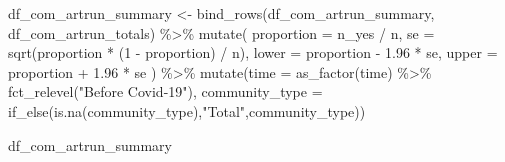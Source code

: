 \documentclass[
  letterpaper,
  DIV=11,
  numbers=noendperiod]{scrartcl}
\newenvironment{Shaded}{\begin{snugshade}}{\end{snugshade}}
\newcommand{\AttributeTok}[1]{\textcolor[rgb]{0.40,0.45,0.13}{#1}}
\newcommand{\DecValTok}[1]{\textcolor[rgb]{0.68,0.00,0.00}{#1}}
\newcommand{\FloatTok}[1]{\textcolor[rgb]{0.68,0.00,0.00}{#1}}
\newcommand{\FunctionTok}[1]{\textcolor[rgb]{0.28,0.35,0.67}{#1}}
\newcommand{\NormalTok}[1]{\textcolor[rgb]{0.00,0.23,0.31}{#1}}
\newcommand{\OtherTok}[1]{\textcolor[rgb]{0.00,0.23,0.31}{#1}}
\newcommand{\SpecialCharTok}[1]{\textcolor[rgb]{0.37,0.37,0.37}{#1}}
\newcommand{\StringTok}[1]{\textcolor[rgb]{0.13,0.47,0.30}{#1}}
\begin{document}
\begin{Shaded}
\begin{Highlighting}[]
\NormalTok{df\_com\_artrun\_summary }\OtherTok{\textless{}{-}} \FunctionTok{bind\_rows}\NormalTok{(df\_com\_artrun\_summary, df\_com\_artrun\_totals) }\SpecialCharTok{\%\textgreater{}\%}
  \FunctionTok{mutate}\NormalTok{(}
    \AttributeTok{proportion =}\NormalTok{ n\_yes }\SpecialCharTok{/}\NormalTok{ n,}
    \AttributeTok{se =} \FunctionTok{sqrt}\NormalTok{(proportion }\SpecialCharTok{*}\NormalTok{ (}\DecValTok{1} \SpecialCharTok{{-}}\NormalTok{ proportion) }\SpecialCharTok{/}\NormalTok{ n),}
    \AttributeTok{lower =}\NormalTok{ proportion }\SpecialCharTok{{-}} \FloatTok{1.96} \SpecialCharTok{*}\NormalTok{ se,}
    \AttributeTok{upper =}\NormalTok{ proportion }\SpecialCharTok{+} \FloatTok{1.96} \SpecialCharTok{*}\NormalTok{ se}
\NormalTok{  ) }\SpecialCharTok{\%\textgreater{}\%} 
 \FunctionTok{mutate}\NormalTok{(}\AttributeTok{time =} \FunctionTok{as\_factor}\NormalTok{(time) }\SpecialCharTok{\%\textgreater{}\%} 
           \FunctionTok{fct\_relevel}\NormalTok{(}\StringTok{"Before Covid{-}19"}\NormalTok{),}
         \AttributeTok{community\_type =} \FunctionTok{if\_else}\NormalTok{(}\FunctionTok{is.na}\NormalTok{(community\_type),}\StringTok{"Total"}\NormalTok{,community\_type))}




  
\NormalTok{df\_com\_artrun\_summary}
\end{Highlighting}
\end{Shaded}
\end{document}

